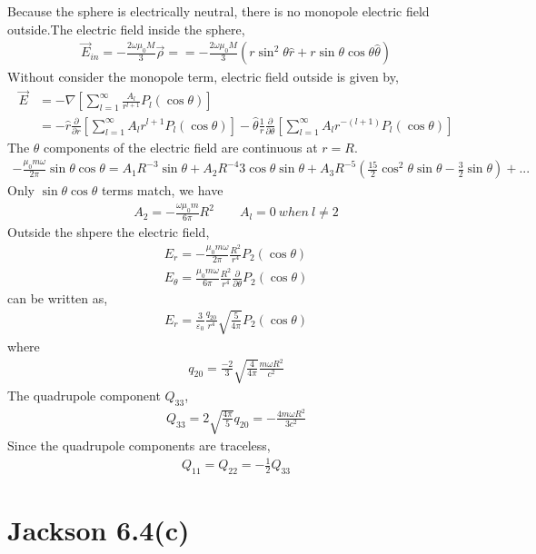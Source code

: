 \documentclass{article}
\newcommand{\pd}[2]{\frac{\partial#1}{\partial#2}}
\begin{document}
Because the sphere is electrically neutral, there is no monopole electric field outside.The electric field inside the sphere,
\begin{align*}
  \vec E_{in}=-\frac{2\omega\mu_0M}{3}\vec \rho==-\frac{2\omega\mu_0M}{3}(r\sin^2\theta\hat r+r\sin\theta\cos\theta\hat \theta)
\end{align*}
Without consider the monopole term, electric field outside is given by,
\begin{align*}
  \vec E&=-\nabla[\sum_{l=1}^{\infty}\frac{A_l}{r^{l+1}}P_l(\cos\theta)]\\
        &=-\hat r\pd{}{r}[\sum_{l=1}^\infty A_lr^{l+1}P_l(\cos\theta)]-\hat\theta\frac{1}{r}\pd{}{\theta}[\sum_{l=1}^{\infty}A_lr^{-(l+1)}P_l(\cos\theta)]
\end{align*}
The $\theta$ components of the electric field are continuous at $r=R$.
\begin{align*}
  -\frac{\mu_0 m\omega}{2\pi}\sin\theta\cos\theta=A_1R^{-3}\sin\theta+A_2R^{-4}3\cos\theta\sin\theta+A_3R^{-5}(\frac{15}{2}\cos^2\theta\sin\theta-\frac{3}{2}\sin\theta)+...
\end{align*}
Only $\sin\theta\cos\theta$ terms match, we have
\begin{align*}
  A_2=-\frac{\omega\mu_0 m}{6\pi}R^2\qquad A_l=0\ when\ l\neq 2
\end{align*}
Outside the shpere the electric field,
\begin{align*}
  E_r=-\frac{\mu_0 m \omega}{2\pi}\frac{R^2}{r^4}P_2(\cos\theta)\\
  E_\theta=\frac{\mu_0 m \omega}{6\pi}\frac{R^2}{r^4}\pd{}{\theta}P_2(\cos\theta)
\end{align*}
can be written as,
\begin{align*}
  E_r=\frac{3}{\varepsilon_0}\frac{q_{20}}{r^4}\sqrt{\frac{5}{4\pi}}P_2(\cos\theta)
\end{align*}
where
\begin{align*}
  q_{20}=\frac{-2}{3}\sqrt{\frac{4}{4\pi}}\frac{m\omega R^2}{c^2}
\end{align*}
The quadrupole component $Q_{33}$,
\begin{align*}
  Q_{33}=2\sqrt{\frac{4\pi}{5}}q_{20}=-\frac{4m\omega R^2}{3c^2}
\end{align*}
Since the quadrupole components are traceless,
\begin{align*}
  Q_{11}=Q_{22}=-\frac{1}{2}Q_{33}
\end{align*}

\section*{Jackson 6.4(c)}
\end{document}
